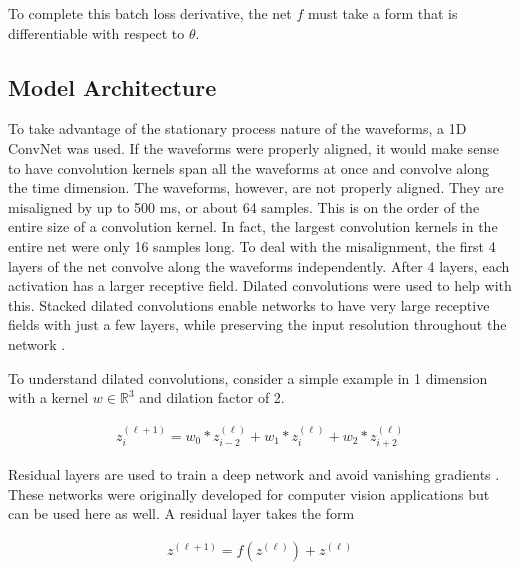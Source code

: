To complete this batch loss derivative, the net $f$ must take a form that is differentiable with respect to $\theta$.



\subsection{Model Architecture}

To take advantage of the stationary process nature of the waveforms, a 1D ConvNet was used.  If the waveforms were properly aligned, it would make sense to have convolution kernels span all the waveforms at once and convolve along the time dimension.  The waveforms, however, are not properly aligned.  They are misaligned by up to 500 ms, or about 64 samples.  This is on the order of the entire size of a convolution kernel.  In fact, the largest convolution kernels in the entire net were only 16 samples long.  To deal with the misalignment, the first 4 layers of the net convolve along the waveforms independently.  After 4 layers, each activation has a larger receptive field.  Dilated convolutions were used to help with this.  Stacked dilated convolutions enable networks to have very large receptive fields with just a few layers, while preserving the input resolution throughout the network \cite{oord2016wavenet}.  

To understand dilated convolutions, consider a simple example in 1 dimension with a kernel $w \in \mathbb{R}^3$ and dilation factor of 2.

\begin{gather}
    z_i^{(\ell + 1)} = 
        w_0 * z_{i - 2}^{(\ell)} +
        w_1 * z_{i}^{(\ell)} +
        w_2 * z_{i + 2}^{(\ell)}
\end{gather}

Residual layers are used to train a deep network and avoid vanishing gradients \cite{he2016deep}.  These networks were originally developed for computer vision applications but can be used here as well.  A residual layer takes the form

\begin{gather}
    z^{(\ell + 1)} = f(z^{(\ell)}) + z^{(\ell)}
\end{gather}

